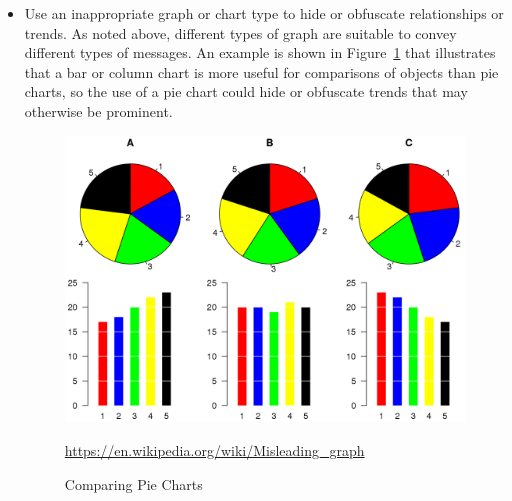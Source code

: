 \begin{itemize}
	\item Use an inappropriate graph or chart type to hide or obfuscate relationships or trends. As noted above, different types of graph are suitable to convey different types of messages. An example is shown in Figure~\ref{fig:comparingpies} that illustrates that a bar or column chart is more useful for comparisons of objects than pie charts, so the use of a pie chart could hide or obfuscate trends that may otherwise be prominent.
	
\begin{figure}
\centering
\includegraphics[width=.8\textwidth]{screen7.png}

\scriptsize\url{https://en.wikipedia.org/wiki/Misleading_graph}
\caption{Comparing Pie Charts}
\label{fig:comparingpies}
\end{figure}


\end{itemize}
